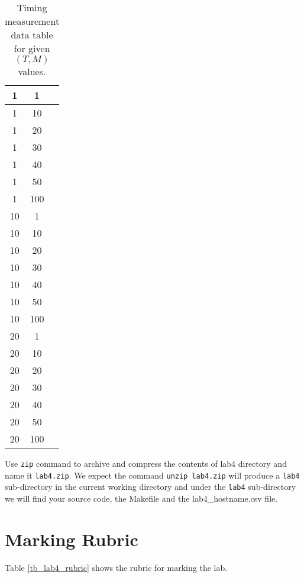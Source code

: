 \begin{enumerate}
\begin{table}[h]
\begin{center}
\begin{tabular}{|c|c|c|}
1 &    1 &    \\ \hline
1 &    10 &    \\ \hline
1 &    20 &    \\ \hline
1 &    30 &    \\ \hline
1 &    40 &    \\ \hline
1 &    50 &    \\ \hline
1 &    100 &    \\ \hline
10 &    1 &    \\ \hline
10 &    10 &    \\ \hline
10 &    20 &    \\ \hline
10 &    30 &    \\ \hline
10 &    40 &    \\ \hline
10 &    50 &    \\ \hline
10 &    100 &    \\ \hline
20 &    1 &    \\ \hline
20 &    10 &    \\ \hline
20 &    20 &    \\ \hline
20 &    30 &    \\ \hline
20 &    40 &    \\ \hline
20 &    50 &    \\ \hline
20 &    100 &    \\ \hline

\end{tabular}
\caption{Timing measurement data table for given $(T, M)$ values.}
\label{tb_timing_lab4}
\end{center}
\end{table}
\end{enumerate}
Use \verb+zip+ command to archive and compress the contents of lab4 directory and name it \verb+lab4.zip+. We expect the command \verb+unzip lab4.zip+ will produce a \verb+lab4+ sub-directory in the current working directory and under the \verb+lab4+ sub-directory we will find your source code, the Makefile and the lab4\_hostname.csv file.

\section{Marking Rubric}

Table \ref{tb_lab4_rubric} shows the rubric for marking the lab.

